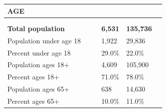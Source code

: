 \documentclass[9pt]{report}
\begin{document}
\vspace{24pt}
\setlength{\tabcolsep}{.01in} %
\begin{tabular}{p{.10in}p{.10in}p{.10in}p{3.7in}>{\hfill}p{.85in}>{\hfill}p{.85in}>{\hfill}p{.85in}>{\hfill}p{.85in}p{0.1in}}
\multicolumn{9}{l}{\parbox{7.1in}{\raggedright{\large{\strut\textbf{AGE}\strut}}}} \\ 
\hline
\multicolumn{4}{l}{\parbox{3.5in}{\raggedright{\textbf{}}}} & \multicolumn{1}{r}{\parbox{.85in}{\strut\raggedleft{\textbf{}\strut}}} & \multicolumn{1}{r}{\parbox{.85in}{\strut\raggedleft{\textbf{}\strut}}} & \multicolumn{1}{r}{\parbox{.85in}{\strut{}}} & \multicolumn{1}{r}{\parbox{.85in}{\strut{}}} & \\ 
\multicolumn{9}{l}{} \\ 
\multicolumn{4}{l}{\parbox{3.5in}{\strut\raggedright{\textbf{Total population}\strut}}} & \textbf{} & \textbf{} & \textbf{6,531} & \textbf{135,736} & \textbf{} \\ 
\multicolumn{4}{l}{\parbox{3.6in}{\strut\raggedright{{Population under age 18}}\strut}} &  &  & 1,922 & 29,836 & \multicolumn{1}{l}{}  \\ 
\multicolumn{4}{l}{\parbox{3.6in}{\strut\raggedright{{Percent under age 18}}\strut}} &  &  & 29.0\% & 22.0\% & \multicolumn{1}{l}{}  \\ 
\multicolumn{4}{l}{\parbox{3.6in}{\strut\raggedright{{Population ages 18+}}\strut}} &  &  & 4,609 & 105,900 & \multicolumn{1}{l}{}  \\ 
\multicolumn{4}{l}{\parbox{3.6in}{\strut\raggedright{{Percent ages 18+}}\strut}} &  &  & 71.0\% & 78.0\% & \multicolumn{1}{l}{}  \\ 
\multicolumn{4}{l}{\parbox{3.6in}{\strut\raggedright{{Population ages 65+}}\strut}} &  &  & 638 & 14,630 & \multicolumn{1}{l}{}  \\ 
\multicolumn{4}{l}{\parbox{3.6in}{\strut\raggedright{{Percent ages 65+}}\strut}} &  &  & 10.0\% & 11.0\% & \multicolumn{1}{l}{}  \\ 

\end{tabular}
\setlength{\tabcolsep}{6pt} %
\end{document}
